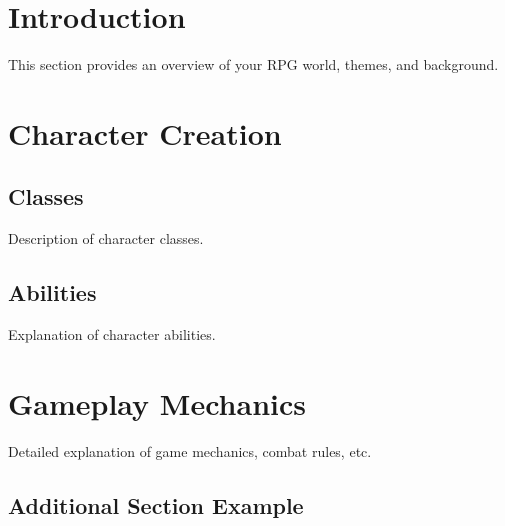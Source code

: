 \documentclass[twocolumn,12pt]{article}  %
\begin{document}
\clearpage

\clearpage
\tableofcontents
\clearpage

\section{Introduction}
This section provides an overview of your RPG world, themes, and background.

\section{Character Creation}
\subsection{Classes}
Description of character classes.

\subsection{Abilities}
Explanation of character abilities.

\section{Gameplay Mechanics}
Detailed explanation of game mechanics, combat rules, etc.

\begin{multicols}{2}
\section{Additional Section Example}
\lipsum[1-3]  %
\end{multicols}
\end{document}
